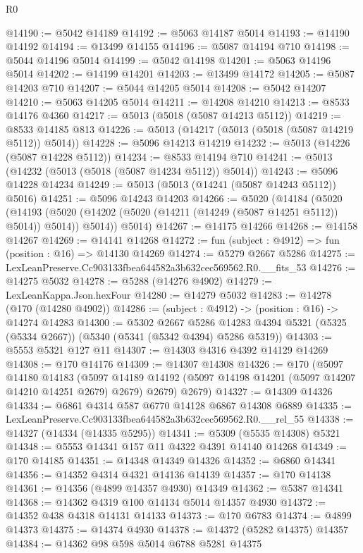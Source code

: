 \begin{lexlean}{R0}
\begin{coremodule}
@14190 := @5042 @14189
@14192 := @5063 @14187 @5014
@14193 := @14190 @14192
@14194 := @13499 @14155
@14196 := @5087 @14194 @710
@14198 := @5044 @14196 @5014
@14199 := @5042 @14198
@14201 := @5063 @14196 @5014
@14202 := @14199 @14201
@14203 := @13499 @14172
@14205 := @5087 @14203 @710
@14207 := @5044 @14205 @5014
@14208 := @5042 @14207
@14210 := @5063 @14205 @5014
@14211 := @14208 @14210
@14213 := @8533 @14176 @4360
@14217 := @5013 (@5018 (@5087 @14213 @5112))
@14219 := @8533 @14185 @813
@14226 := @5013 (@14217 (@5013 (@5018 (@5087 @14219 @5112)) @5014))
@14228 := @5096 @14213 @14219
@14232 := @5013 (@14226 (@5087 @14228 @5112))
@14234 := @8533 @14194 @710
@14241 := @5013 (@14232 (@5013 (@5018 (@5087 @14234 @5112)) @5014))
@14243 := @5096 @14228 @14234
@14249 := @5013 (@5013 (@14241 (@5087 @14243 @5112)) @5016)
@14251 := @5096 @14243 @14203
@14266 := @5020
    (@14184
      (@5020
        (@14193 (@5020 (@14202 (@5020 (@14211 (@14249 (@5087 @14251 @5112)) @5014)) @5014)) @5014))
      @5014)
@14267 := @14175 @14266
@14268 := @14158 @14267
@14269 := @14141 @14268
@14272 := fun (subject : @4912) => fun (position : @16) => @14130 @14269
@14274 := @5279 @2667 @5286
@14275 := LexLeanPreserve.Cc903133fbea644582a3b632cec569562.R0.__fits_53
@14276 := @14275 @5032
@14278 := @5288 (@14276 @4902)
@14279 := LexLeanKappa.Json.hexFour
@14280 := @14279 @5032
@14283 := @14278 (@170 (@14280 @4902))
@14286 := (subject : @4912) -> (position : @16) -> @14274 @14283
@14300 := @5302
    @2667
    @5286
    @14283
    @4394
    @5321
    (@5325 (@5334 @2667))
    (@5340 (@5341 (@5342 @4394) @5286 @5319))
@14303 := @5553 @5321 @127 @11
@14307 := @14303 @4316 @4392 @14129 @14269
@14308 := @170 @14176
@14309 := @14307 @14308
@14326 := @170
    (@5097
      @14180
      @14183
      (@5097 @14189 @14192 (@5097 @14198 @14201 (@5097 @14207 @14210 @14251 @2679) @2679) @2679)
      @2679)
@14327 := @14309 @14326
@14334 := @6861 @4314 @587 @6770 @14128 @6867 @14308 @6889
@14335 := LexLeanPreserve.Cc903133fbea644582a3b632cec569562.R0.__rel_55
@14338 := @14327 (@14334 (@14335 @5295))
@14341 := @5309 (@5535 @14308) @5321
@14348 := @5553 @14341 @157 @11 @4322 @4391 @14140 @14268
@14349 := @170 @14185
@14351 := @14348 @14349 @14326
@14352 := @6860 @14341
@14356 := @14352 @4314 @4321 @14136 @14139
@14357 := @170 @14138
@14361 := @14356 (@4899 @14357 @4930) @14349
@14362 := @5387 @14341
@14368 := @14362 @4319 @100 @14134 @5014 @14357 @4930
@14372 := @14352 @438 @4318 @14131 @14133
@14373 := @170 @6783
@14374 := @4899 @14373
@14375 := @14374 @4930
@14378 := @14372 (@5282 @14375) @14357
@14384 := @14362 @98 @598 @5014 @6788 @5281 @14375

\end{coremodule}
\end{lexlean}
